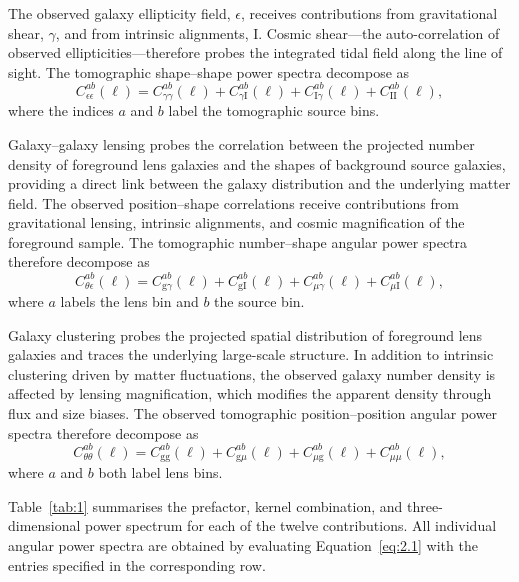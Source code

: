 The observed galaxy ellipticity field, \(\epsilon\), receives contributions from gravitational shear, \(\gamma\), and from intrinsic alignments, \(\mathrm{I}\). Cosmic shear---the auto-correlation of observed ellipticities---therefore probes the integrated tidal field along the line of sight. The tomographic shape--shape power spectra decompose as
\begin{equation} \label{eq:2.5}
    C_{\epsilon\epsilon}^{ab}(\ell) = C_{\gamma\gamma}^{ab}(\ell) + C_{\gamma\mathrm{I}}^{ab}(\ell) + C_{\mathrm{I}\gamma}^{ab}(\ell) + C_{\mathrm{II}}^{ab}(\ell),
\end{equation}
where the indices \(a\) and \(b\) label the tomographic source bins.

Galaxy--galaxy lensing probes the correlation between the projected number density of foreground lens galaxies and the shapes of background source galaxies, providing a direct link between the galaxy distribution and the underlying matter field. The observed position--shape correlations receive contributions from gravitational lensing, intrinsic alignments, and cosmic magnification of the foreground sample. The tomographic number--shape angular power spectra therefore decompose as
\begin{equation} \label{eq:2.6}
    C_{\theta\epsilon}^{ab}(\ell) = C_{\mathrm{g}\gamma}^{ab}(\ell) + C_{\mathrm{g}\mathrm{I}}^{ab}(\ell) + C_{\mu\gamma}^{ab}(\ell) + C_{\mu\mathrm{I}}^{ab}(\ell),
\end{equation}
where \(a\) labels the lens bin and \(b\) the source bin.

Galaxy clustering probes the projected spatial distribution of foreground lens galaxies and traces the underlying large-scale structure. In addition to intrinsic clustering driven by matter fluctuations, the observed galaxy number density is affected by lensing magnification, which modifies the apparent density through flux and size biases. The observed tomographic position--position angular power spectra therefore decompose as
\begin{equation} \label{eq:2.7}
    C_{\theta\theta}^{ab}(\ell) = C_{\mathrm{g}\mathrm{g}}^{ab}(\ell) + C_{\mathrm{g}\mu}^{ab}(\ell) + C_{\mu\mathrm{g}}^{ab}(\ell) + C_{\mu\mu}^{ab}(\ell),
\end{equation}
where \(a\) and \(b\) both label lens bins.

Table~\ref{tab:1} summarises the prefactor, kernel combination, and three-dimensional power spectrum for each of the twelve contributions. All individual angular power spectra are obtained by evaluating Equation~\ref{eq:2.1} with the entries specified in the corresponding row.

